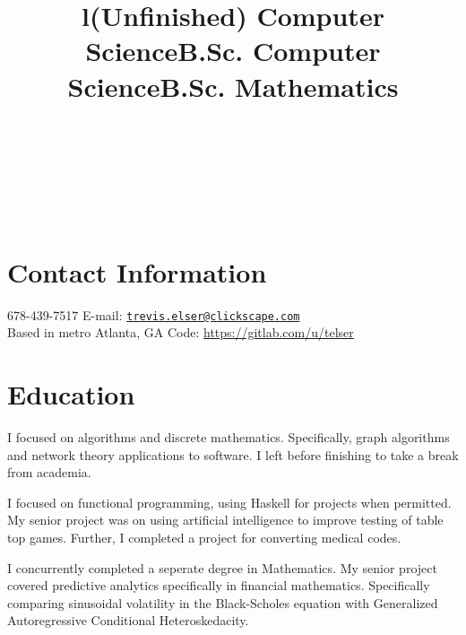 \documentclass[margintitle,line]{res}
\begin{document}

\begin{resume}

\begin{format}
\\
\title{l}\\
\body\\
\end{format}

\section{Contact Information}

678-439-7517 \hfill {E-mail:}
\href{mailto:trevis.elser@clickscape.com}{\nolinkurl{trevis.elser@clickscape.com}} \\
Based in metro Atlanta, GA \hfill {Code:}
\href{https://gitlab.com/u/telser}{https://gitlab.com/u/telser}  \\

\section{Education}

\title{(Unfinished) Computer Science}
\begin{position}
I focused on algorithms and discrete mathematics. Specifically, graph
algorithms and network theory applications to software. I left before
finishing to take a break from academia.
\end{position}

\title{B.Sc. Computer Science}
\begin{position}
I focused on functional programming, using Haskell for projects when
permitted. My senior project was on using artificial intelligence to
improve testing of table top games. Further, I completed a project for
converting medical codes.
\end{position}

\title{B.Sc. Mathematics}
\begin{position}
I concurrently completed a seperate degree in Mathematics. My senior
project covered predictive analytics specifically in financial
mathematics. Specifically comparing sinusoidal volatility in the
Black-Scholes equation with Generalized Autoregressive Conditional
Heteroskedacity.
\end{position}


\end{resume}
\end{document}

